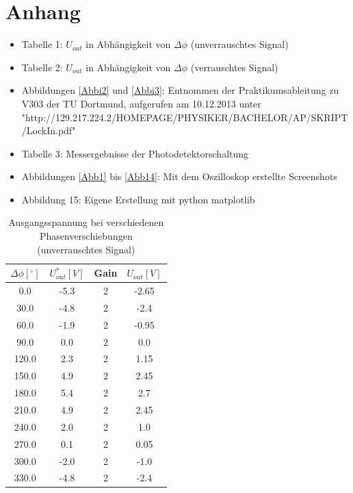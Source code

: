 \documentclass[11pt]{article}
\begin{document}
\section{Anhang}
\begin{itemize}
\item Tabelle 1: $U_{out}$ in Abhängigkeit von $\Delta\phi$ (unverrauschtes Signal)
\item Tabelle 2: $U_{out}$ in Abhängigkeit von $\Delta\phi$ (verrauschtes Signal)
\item Abbildungen \ref{Abbi2} und \ref{Abbi3}: Entnommen der Praktikumsableitung zu V303 der TU Dortmund, aufgerufen am 10.12.2013 unter \newline "http://129.217.224.2/HOMEPAGE/PHYSIKER/BACHELOR/AP/SKRIPT/LockIn.pdf"
\item Tabelle 3: Messergebnisse der Photodetektorschaltung
\item Abbildungen \ref{Abb1} bis \ref{Abb14}: Mit dem Oszilloskop erstellte Screenshots
\item Abbildung 15: Eigene Erstellung mit python matplotlib
 
\end{itemize}
\newpage

\begin{table}[h!]
\centering
\begin{tabular}{|c|c|c|c|}
\hline
$\Delta \phi [^\circ]$ & $U_{out}^* [V]$ & Gain & $U_{out} [V]$ \\
\hline
0.0 & -5.3 & 2 & -2.65\\
30.0 & -4.8 & 2 &-2.4\\
60.0 & -1.9 & 2 &-0.95\\
90.0 & 0.0 & 2 &0.0\\
120.0 & 2.3 & 2 &1.15\\
150.0 & 4.9 & 2 &2.45\\
180.0 & 5.4 & 2 &2.7\\
210.0 & 4.9 & 2 &2.45\\
240.0 & 2.0 & 2 &1.0\\
270.0 & 0.1 & 2 &0.05\\
300.0 & -2.0 & 2 &-1.0\\
330.0 & -4.8 & 2 &-2.4\\
\hline
\end{tabular}
\label{data1}
\caption{Ausgangsspannung bei verschiedenen Phasenverschiebungen \newline (unverrauschtes Signal)}
\end{table}
\end{document}

